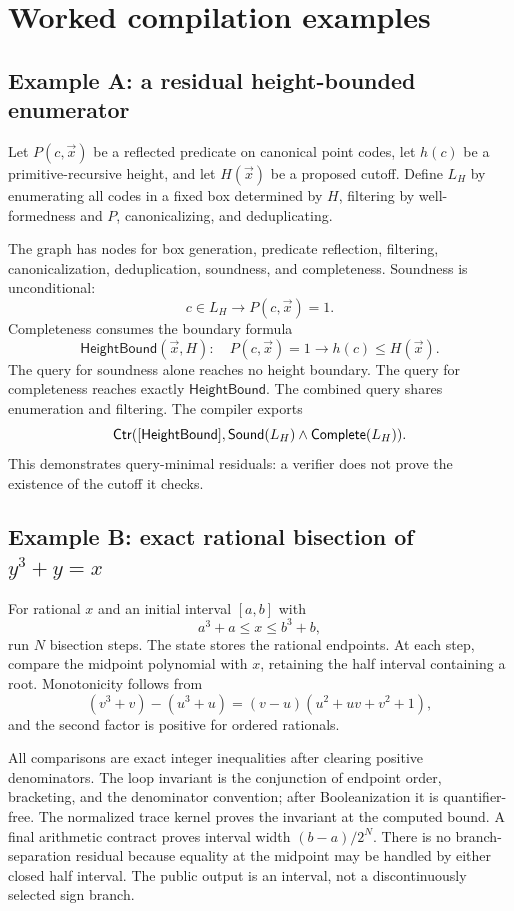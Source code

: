 \section{Worked compilation examples}\label{sec:examples}

\subsection{Example A: a residual height-bounded enumerator}

Let \(P(c,\vec x)\) be a reflected predicate on canonical point codes, let \(h(c)\) be a primitive-recursive height, and let \(H(\vec x)\) be a proposed cutoff.  Define \(L_H\) by enumerating all codes in a fixed box determined by \(H\), filtering by well-formedness and \(P\), canonicalizing, and deduplicating.

The graph has nodes for box generation, predicate reflection, filtering, canonicalization, deduplication, soundness, and completeness.  Soundness is unconditional:
\[
  c\in L_H\longrightarrow P(c,\vec x)=1.
\]
Completeness consumes the boundary formula
\[
 \mathsf{HeightBound}(\vec x,H):
 \quad P(c,\vec x)=1\longrightarrow h(c)\le H(\vec x).
\]
The query for soundness alone reaches no height boundary.  The query for completeness reaches exactly \(\mathsf{HeightBound}\).  The combined query shares enumeration and filtering.  The compiler exports
\[
 \mathsf{Ctr}([\mathsf{HeightBound}],\mathsf{Sound}(L_H)\wedge
          \mathsf{Complete}(L_H)).
\]
This demonstrates query-minimal residuals: a verifier does not prove the existence of the cutoff it checks.

\subsection{Example B: exact rational bisection of \(y^3+y=x\)}

For rational \(x\) and an initial interval \([a,b]\) with
\[
 a^3+a\le x\le b^3+b,
\]
run \(N\) bisection steps.  The state stores the rational endpoints.  At each step, compare the midpoint polynomial with \(x\), retaining the half interval containing a root.  Monotonicity follows from
\[
 (v^3+v)-(u^3+u)=(v-u)(u^2+uv+v^2+1),
\]
and the second factor is positive for ordered rationals.

All comparisons are exact integer inequalities after clearing positive denominators.  The loop invariant is the conjunction of endpoint order, bracketing, and the denominator convention; after Booleanization it is quantifier-free.  The normalized trace kernel proves the invariant at the computed bound.  A final arithmetic contract proves interval width \((b-a)/2^N\).  There is no branch-separation residual because equality at the midpoint may be handled by either closed half interval.  The public output is an interval, not a discontinuously selected sign branch.

